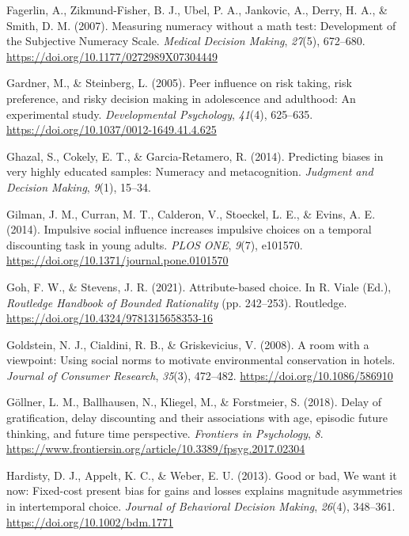 \documentclass[
  pub,floatsintext]{apa6}
\newlength{\cslhangindent}
\newlength{\cslentryspacingunit} %
\newenvironment{CSLReferences}[2] %
 {%
  \setlength{\parindent}{0pt}
  \ifodd #1
  \let\oldpar\par
  \def\par{\hangindent=\cslhangindent\oldpar}
  \fi
  \setlength{\parskip}{#2\cslentryspacingunit}
 }%
 {}
\begin{document}
\begin{CSLReferences}{1}{0}
\leavevmode{}%
Fagerlin, A., Zikmund-Fisher, B. J., Ubel, P. A., Jankovic, A., Derry, H. A., \& Smith, D. M. (2007). Measuring numeracy without a math test: {Development} of the {Subjective} {Numeracy} {Scale}. \emph{Medical Decision Making}, \emph{27}(5), 672--680. \url{https://doi.org/10.1177/0272989X07304449}

\leavevmode{}%
Gardner, M., \& Steinberg, L. (2005). Peer influence on risk taking, risk preference, and risky decision making in adolescence and adulthood: {An} experimental study. \emph{Developmental Psychology}, \emph{41}(4), 625--635. \url{https://doi.org/10.1037/0012-1649.41.4.625}

\leavevmode{}%
Ghazal, S., Cokely, E. T., \& Garcia-Retamero, R. (2014). Predicting biases in very highly educated samples: {Numeracy} and metacognition. \emph{Judgment and Decision Making}, \emph{9}(1), 15--34.

\leavevmode{}%
Gilman, J. M., Curran, M. T., Calderon, V., Stoeckel, L. E., \& Evins, A. E. (2014). Impulsive social influence increases impulsive choices on a temporal discounting task in young adults. \emph{PLOS ONE}, \emph{9}(7), e101570. \url{https://doi.org/10.1371/journal.pone.0101570}

\leavevmode{}%
Goh, F. W., \& Stevens, J. R. (2021). Attribute-based choice. In R. Viale (Ed.), \emph{Routledge {Handbook} of {Bounded} {Rationality}} (pp. 242--253). Routledge. \url{https://doi.org/10.4324/9781315658353-16}

\leavevmode{}%
Goldstein, N. J., Cialdini, R. B., \& Griskevicius, V. (2008). A room with a viewpoint: {Using} social norms to motivate environmental conservation in hotels. \emph{Journal of Consumer Research}, \emph{35}(3), 472--482. \url{https://doi.org/10.1086/586910}

\leavevmode{}%
Göllner, L. M., Ballhausen, N., Kliegel, M., \& Forstmeier, S. (2018). Delay of gratification, delay discounting and their associations with age, episodic future thinking, and future time perspective. \emph{Frontiers in Psychology}, \emph{8}. \url{https://www.frontiersin.org/article/10.3389/fpsyg.2017.02304}

\leavevmode{}%
Hardisty, D. J., Appelt, K. C., \& Weber, E. U. (2013). Good or bad, {We} want it now: {Fixed}-cost present bias for gains and losses explains magnitude asymmetries in intertemporal choice. \emph{Journal of Behavioral Decision Making}, \emph{26}(4), 348--361. \url{https://doi.org/10.1002/bdm.1771}


\end{CSLReferences}
\end{document}
